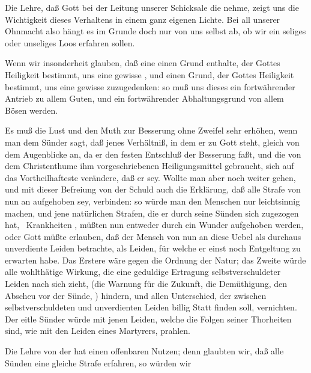 \begin{aufza}
\item Die Lehre, daß Gott bei der Leitung unserer Schicksale die  nehme, zeigt uns die Wichtigkeit dieses Verhaltens in einem ganz eigenen Lichte. Bei all unserer Ohnmacht also hängt es im Grunde doch nur von uns selbst ab, ob wir ein seliges oder unseliges Loos erfahren sollen.
\item Wenn wir insonderheit glauben, daß eine  einen Grund enthalte, der Gottes Heiligkeit bestimmt, uns eine gewisse , und  einen Grund, der Gottes Heiligkeit bestimmt, uns eine gewisse  zuzugedenken: so muß uns dieses ein fortwährender Antrieb zu allem Guten, und ein fortwährender Abhaltungsgrund von allem Bösen werden.
\item Es muß die Lust und den Muth zur Besserung ohne Zweifel sehr erhöhen, wenn man dem Sünder sagt, daß jenes Verhältniß, in dem er zu Gott steht, gleich von dem Augenblicke an, da er den festen Entschluß der Besserung faßt, und die von dem Christenthume ihm vorgeschriebenen Heiligungsmittel gebraucht, sich auf das Vortheilhafteste verändere, daß er  sey. Wollte man aber noch weiter gehen, und mit dieser Befreiung von der Schuld auch die Erklärung, daß alle Strafe von nun an aufgehoben sey, verbinden: so würde man den Menschen nur leichtsinnig machen, und jene natürlichen Strafen, die er durch seine Sünden sich zugezogen hat, \zB\ Krankheiten \udgl , müßten nun entweder durch ein Wunder aufgehoben werden, oder Gott müßte erlauben, daß der Mensch von nun an diese Uebel als durchaus unverdiente Leiden betrachte, als Leiden, für welche er einst noch Entgeltung zu erwarten habe. Das Erstere wäre gegen die Ordnung der Natur; das Zweite würde alle wohlthätige Wirkung, die eine geduldige Ertragung selbstverschuldeter Leiden nach sich zieht, (die Warnung für die Zukunft, die Demüthigung, den Abscheu vor der Sünde, \usw ) hindern, und allen Unterschied, der zwischen selbstverschuldeten und unverdienten Leiden billig Statt finden soll, vernichten. Der eitle Sünder würde mit jenen Leiden, welche die Folgen seiner Thorheiten sind, wie mit den Leiden eines Martyrers, prahlen.
\item Die Lehre von der  hat einen offenbaren Nutzen; denn glaubten wir, daß alle Sünden eine gleiche Strafe erfahren, so würden wir

\end{aufza}
